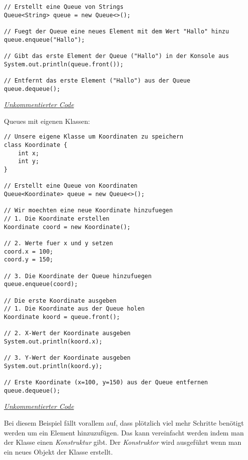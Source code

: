 \begin{center}   
\begin{lstlisting}
// Erstellt eine Queue von Strings
Queue<String> queue = new Queue<>();

// Fuegt der Queue eine neues Element mit dem Wert "Hallo" hinzu
queue.enqueue("Hallo");

// Gibt das erste Element der Queue ("Hallo") in der Konsole aus
System.out.println(queue.front());

// Entfernt das erste Element ("Hallo") aus der Queue
queue.dequeue();
\end{lstlisting}
\href{https://raw.githubusercontent.com/tim-tm/informatik-notes/main/code/Queue_Beispiel1.java}{\textit{Unkommentierter Code}} \\
\end{center}

\begin{flushleft}
    Queues mit eigenen Klassen:
\end{flushleft}

\begin{center}
\begin{lstlisting}
// Unsere eigene Klasse um Koordinaten zu speichern
class Koordinate {
    int x;
    int y;
}

// Erstellt eine Queue von Koordinaten
Queue<Koordinate> queue = new Queue<>();

// Wir moechten eine neue Koordinate hinzufuegen
// 1. Die Koordinate erstellen
Koordinate coord = new Koordinate();

// 2. Werte fuer x und y setzen
coord.x = 100;
coord.y = 150;

// 3. Die Koordinate der Queue hinzufuegen
queue.enqueue(coord);

// Die erste Koordinate ausgeben
// 1. Die Koordinate aus der Queue holen
Koordinate koord = queue.front();

// 2. X-Wert der Koordinate ausgeben
System.out.println(koord.x);

// 3. Y-Wert der Koordinate ausgeben
System.out.println(koord.y);

// Erste Koordinate (x=100, y=150) aus der Queue entfernen
queue.dequeue();
\end{lstlisting}
\href{https://raw.githubusercontent.com/tim-tm/informatik-notes/main/code/Queue_Beispiel2.java}{\textit{Unkommentierter Code}} \\
\end{center}

\begin{flushleft}
    Bei diesem Beispiel fällt vorallem auf, dass plötzlich viel mehr Schritte benötigt werden um ein Element hinzuzufügen.
    Das kann vereinfacht werden indem man der Klasse einen \textit{Konstruktur} gibt.
    Der \textit{Konstruktor} wird ausgeführt wenn man ein neues Objekt der Klasse erstellt.
\end{flushleft}


